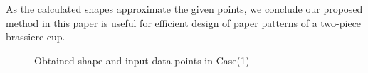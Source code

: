 \documentclass[E]{scitrans}
\begin{document}
As the calculated shapes approximate the given points, we conclude our proposed method in this paper is useful for efficient design of paper patterns of a two-piece brassiere cup.
\begin{figure}[h]
	\centering
	\hfil
	\hfil
	\caption{Obtained shape and input data points in Case(1)}
	\label{fig:ObtainedSurfaceNDS}
\end{figure}
\end{document}
